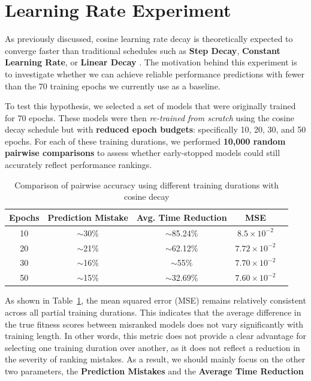 \clearpage

\section{Learning Rate Experiment}

As previously discussed, cosine learning rate decay is theoretically expected to converge faster than traditional schedules such as \textbf{Step Decay}, \textbf{Constant Learning Rate}, or \textbf{Linear Decay} \cite{li2019exponential}  \cite{kim2021automated}. The motivation behind this experiment is to investigate whether we can achieve reliable performance predictions with fewer than the 70 training epochs we currently use as a baseline.

To test this hypothesis, we selected a set of models that were originally trained for 70 epochs. These models were then \textit{re-trained from scratch} using the cosine decay schedule but with \textbf{reduced epoch budgets}: specifically 10, 20, 30, and 50 epochs. For each of these training durations, we performed \textbf{10,000 random pairwise comparisons} to assess whether early-stopped models could still accurately reflect performance rankings.


\begin{table}[ht]
\centering
\begin{tabular}{|c|c|c|c|p{8.5cm}}
\hline
\textbf{Epochs} & \textbf{Prediction Mistake} & \textbf{Avg. Time Reduction} & \textbf{MSE} \\
\hline
10 & $\sim$30\% & $\sim$85.24\% & \( 8.5 \times 10^{-2} \) \\
20 & $\sim$21\% & $\sim$62.12\% & \( 7.72 \times 10^{-2} \) \\
30 & $\sim$16\% & $\sim$55\%    & \( 7.70 \times 10^{-2} \) \\
50 & $\sim$15\% & $\sim$32.69\% & \( 7.60 \times 10^{-2} \) \\
\hline
\end{tabular}
\caption{Comparison of  pairwise accuracy using different training durations with cosine decay}
\label{tab:cosine_decay_results}
\end{table}


As shown in Table~\ref{tab:cosine_decay_results}, the mean squared error (MSE) remains relatively consistent across all partial training durations. This indicates that the average difference in the true fitness scores between misranked models does not vary significantly with training length. In other words, this metric does not provide a clear advantage for selecting one training duration over another, as it does not reflect a reduction in the severity of ranking mistakes. As a result, we should mainly focus on the other two parameters, the \textbf{Prediction Mistakes} and the \textbf{Average Time Reduction}

